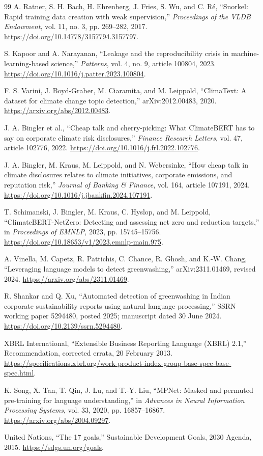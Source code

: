 \begin{thebibliography}{99}
A. Ratner, S. H. Bach, H. Ehrenberg, J. Fries, S. Wu, and C. R\'{e}, ``Snorkel: Rapid training data creation with weak supervision,'' \emph{Proceedings of the VLDB Endowment}, vol. 11, no. 3, pp. 269--282, 2017. \url{https://doi.org/10.14778/3157794.3157797}.

S. Kapoor and A. Narayanan, ``Leakage and the reproducibility crisis in machine-learning-based science,'' \emph{Patterns}, vol. 4, no. 9, article 100804, 2023. \url{https://doi.org/10.1016/j.patter.2023.100804}.

F. S. Varini, J. Boyd-Graber, M. Ciaramita, and M. Leippold, ``ClimaText: A dataset for climate change topic detection,'' arXiv:2012.00483, 2020. \url{https://arxiv.org/abs/2012.00483}.

J. A. Bingler et al., ``Cheap talk and cherry-picking: What ClimateBERT has to say on corporate climate risk disclosures,'' \emph{Finance Research Letters}, vol. 47, article 102776, 2022. \url{https://doi.org/10.1016/j.frl.2022.102776}.

J. A. Bingler, M. Kraus, M. Leippold, and N. Webersinke, ``How cheap talk in climate disclosures relates to climate initiatives, corporate emissions, and reputation risk,'' \emph{Journal of Banking \& Finance}, vol. 164, article 107191, 2024. \url{https://doi.org/10.1016/j.jbankfin.2024.107191}.

T. Schimanski, J. Bingler, M. Kraus, C. Hyslop, and M. Leippold, ``ClimateBERT-NetZero: Detecting and assessing net zero and reduction targets,'' in \emph{Proceedings of EMNLP}, 2023, pp. 15745--15756. \url{https://doi.org/10.18653/v1/2023.emnlp-main.975}.

A. Vinella, M. Capetz, R. Pattichis, C. Chance, R. Ghosh, and K.-W. Chang, ``Leveraging language models to detect greenwashing,'' arXiv:2311.01469, revised 2024. \url{https://arxiv.org/abs/2311.01469}.

R. Shankar and Q. Xu, ``Automated detection of greenwashing in Indian corporate sustainability reports using natural language processing,'' SSRN working paper 5294480, posted 2025; manuscript dated 30 June 2024. \url{https://doi.org/10.2139/ssrn.5294480}.

XBRL International, ``Extensible Business Reporting Language (XBRL) 2.1,'' Recommendation, corrected errata, 20 February 2013. \url{https://specifications.xbrl.org/work-product-index-group-base-spec-base-spec.html}.

K. Song, X. Tan, T. Qin, J. Lu, and T.-Y. Liu, ``MPNet: Masked and permuted pre-training for language understanding,'' in \emph{Advances in Neural Information Processing Systems}, vol. 33, 2020, pp. 16857--16867. \url{https://arxiv.org/abs/2004.09297}.

United Nations, ``The 17 goals,'' Sustainable Development Goals, 2030 Agenda, 2015. \url{https://sdgs.un.org/goals}.

\end{thebibliography}
